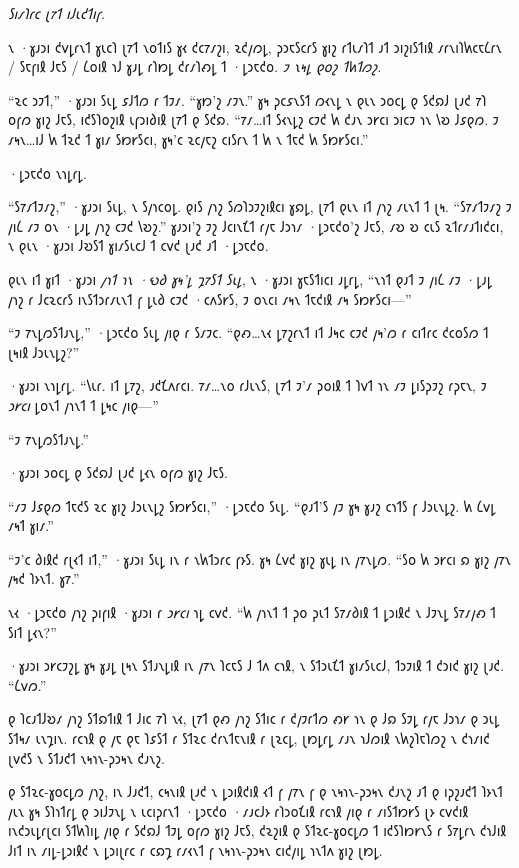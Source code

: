 \emph{𐑕𐑦𐑥𐑐𐑩𐑤 𐑚𐑳𐑑 𐑦𐑓𐑧𐑒𐑑𐑦𐑝.}

𐑯 ·𐑣𐑨𐑮𐑦 𐑒𐑫𐑛𐑩𐑯𐑑 𐑣𐑧𐑤𐑐 𐑚𐑳𐑑 𐑯𐑴𐑑𐑦𐑕 𐑣𐑬 𐑒𐑤𐑳𐑥𐑟𐑦, 𐑷𐑒𐑢𐑼𐑛, 𐑜𐑮𐑱𐑕𐑤𐑩𐑕 𐑣𐑦𐑟 𐑩𐑑𐑧𐑥𐑐𐑑 𐑨𐑑 𐑮𐑦𐑟𐑦𐑕𐑑𐑦𐑙 𐑥𐑩𐑯𐑦𐑐𐑿𐑤𐑱𐑖𐑩𐑯 / 𐑕𐑱𐑝𐑦𐑙 𐑓𐑱𐑕 / 𐑖𐑴𐑦𐑙 𐑪𐑓 𐑣𐑨𐑛 𐑩𐑐𐑽𐑛 𐑒𐑩𐑥𐑐𐑺𐑛 𐑑 ·𐑛𐑮𐑱𐑒𐑴. \emph{𐑲 𐑯𐑰𐑛 𐑞𐑴𐑟 𐑑𐑿𐑑𐑼𐑟.}

“𐑷𐑤 𐑮𐑲𐑑,” ·𐑣𐑨𐑮𐑦 𐑕𐑧𐑛 𐑭𐑓𐑑𐑼 𐑩 𐑑𐑲𐑥. “𐑣𐑽'𐑟 𐑥𐑲𐑯.” 𐑣𐑰 𐑜𐑤𐑭𐑯𐑕𐑑 𐑼𐑬𐑯𐑛 𐑯 𐑞𐑧𐑯 𐑮𐑴𐑤𐑛 𐑞 𐑕𐑒𐑸𐑓 𐑚𐑨𐑒 𐑳𐑐 𐑴𐑝𐑼 𐑣𐑦𐑟 𐑓𐑱𐑕, 𐑦𐑒𐑕𐑐𐑴𐑟𐑦𐑙 𐑧𐑝𐑮𐑦𐑔𐑦𐑙 𐑚𐑳𐑑 𐑞 𐑕𐑒𐑸. “𐑳𐑥…𐑦𐑑 𐑕𐑬𐑯𐑛𐑟 𐑤𐑲𐑒 𐑿 𐑒𐑨𐑯 𐑮𐑾𐑤𐑦 𐑮𐑦𐑤𐑲 𐑪𐑯 𐑘𐑹 𐑓𐑭𐑞𐑼. 𐑲 𐑥𐑰𐑯…𐑦𐑓 𐑿 𐑑𐑷𐑒 𐑑 𐑣𐑦𐑥 𐑕𐑽𐑾𐑕𐑤𐑦, 𐑣𐑰'𐑤 𐑷𐑤𐑢𐑱𐑟 𐑤𐑦𐑕𐑩𐑯 𐑑 𐑿 𐑯 𐑑𐑱𐑒 𐑿 𐑕𐑽𐑾𐑕𐑤𐑦.”

·𐑛𐑮𐑱𐑒𐑴 𐑯𐑪𐑛𐑩𐑛.

“𐑕𐑳𐑥𐑑𐑲𐑥𐑟,” ·𐑣𐑨𐑮𐑦 𐑕𐑧𐑛, 𐑯 𐑕𐑢𐑪𐑤𐑴𐑛. 𐑞𐑦𐑕 𐑢𐑪𐑟 𐑕𐑼𐑐𐑮𐑲𐑟𐑦𐑙𐑤𐑦 𐑣𐑸𐑛, 𐑚𐑳𐑑 𐑞𐑧𐑯 𐑦𐑑 𐑢𐑪𐑟 𐑥𐑧𐑯𐑑 𐑑 𐑚𐑰. “𐑕𐑳𐑥𐑑𐑲𐑥𐑟 𐑲 𐑢𐑦𐑖 𐑥𐑲 𐑴𐑯 ·𐑛𐑨𐑛 𐑢𐑪𐑟 𐑤𐑲𐑒 𐑘𐑹𐑟.” 𐑣𐑨𐑮𐑦'𐑟 𐑲𐑟 𐑓𐑤𐑦𐑯𐑗𐑑 𐑩𐑢𐑱 𐑓𐑮𐑪𐑥 ·𐑛𐑮𐑱𐑒𐑴'𐑟 𐑓𐑱𐑕, 𐑥𐑹 𐑹 𐑤𐑧𐑕 𐑷𐑑𐑩𐑥𐑨𐑑𐑦𐑒𐑤𐑦, 𐑯 𐑞𐑧𐑯 ·𐑣𐑨𐑮𐑦 𐑓𐑹𐑕𐑑 𐑣𐑦𐑥𐑕𐑧𐑤𐑓 𐑑 𐑤𐑫𐑒 𐑚𐑨𐑒 𐑨𐑑 ·𐑛𐑮𐑱𐑒𐑴.

𐑞𐑧𐑯 𐑦𐑑 𐑣𐑦𐑑 ·𐑣𐑨𐑮𐑦 \emph{𐑢𐑪𐑑 𐑪𐑯 ·𐑻𐑔 𐑣𐑰'𐑛 𐑡𐑳𐑕𐑑 𐑕𐑧𐑛}, 𐑯 ·𐑣𐑨𐑮𐑦 𐑣𐑱𐑕𐑑𐑦𐑤𐑦 𐑨𐑛𐑩𐑛, “𐑯𐑪𐑑 𐑞𐑨𐑑 𐑲 𐑢𐑦𐑖 𐑥𐑲 ·𐑛𐑨𐑛 𐑢𐑪𐑟 𐑩 𐑓𐑤𐑷𐑤𐑩𐑕 𐑦𐑯𐑕𐑑𐑮𐑩𐑥𐑧𐑯𐑑 𐑝 𐑛𐑧𐑔 𐑤𐑲𐑒 ·𐑤𐑵𐑕𐑾𐑕, 𐑲 𐑴𐑯𐑤𐑦 𐑥𐑰𐑯 𐑑𐑱𐑒𐑦𐑙 𐑥𐑰 𐑕𐑽𐑾𐑕𐑤𐑦—”

“𐑲 𐑳𐑯𐑛𐑼𐑕𐑑𐑨𐑯𐑛,” ·𐑛𐑮𐑱𐑒𐑴 𐑕𐑧𐑛 𐑢𐑦𐑞 𐑩 𐑕𐑥𐑲𐑤. “𐑞𐑺…𐑯𐑬 𐑛𐑳𐑟𐑩𐑯𐑑 𐑦𐑑 𐑓𐑰𐑤 𐑤𐑲𐑒 𐑢𐑰'𐑼 𐑩 𐑤𐑦𐑑𐑩𐑤 𐑒𐑤𐑴𐑕𐑼 𐑑 𐑚𐑰𐑦𐑙 𐑓𐑮𐑧𐑯𐑛𐑟?”

·𐑣𐑨𐑮𐑦 𐑯𐑪𐑛𐑩𐑛. “𐑘𐑧𐑩. 𐑦𐑑 𐑛𐑳𐑟, 𐑨𐑒𐑗𐑵𐑩𐑤𐑦. 𐑳𐑥…𐑯𐑴 𐑩𐑓𐑧𐑯𐑕, 𐑚𐑳𐑑 𐑲'𐑥 𐑜𐑴𐑦𐑙 𐑑 𐑐𐑫𐑑 𐑪𐑯 𐑥𐑲 𐑛𐑦𐑕𐑜𐑲𐑟 𐑩𐑜𐑱𐑯, 𐑲 \emph{𐑮𐑾𐑤𐑦} 𐑛𐑴𐑯𐑑 𐑢𐑪𐑯𐑑 𐑑 𐑛𐑰𐑤 𐑢𐑦𐑞—”

“𐑲 𐑳𐑯𐑛𐑼𐑕𐑑𐑨𐑯𐑛.”

·𐑣𐑨𐑮𐑦 𐑮𐑴𐑤𐑛 𐑞 𐑕𐑒𐑸𐑓 𐑚𐑨𐑒 𐑛𐑬𐑯 𐑴𐑝𐑼 𐑣𐑦𐑟 𐑓𐑱𐑕.

“𐑥𐑲 𐑓𐑭𐑞𐑼 𐑑𐑱𐑒𐑕 𐑷𐑤 𐑣𐑦𐑟 𐑓𐑮𐑧𐑯𐑛𐑟 𐑕𐑽𐑾𐑕𐑤𐑦,” ·𐑛𐑮𐑱𐑒𐑴 𐑕𐑧𐑛. “𐑞𐑨𐑑'𐑕 𐑢𐑲 𐑣𐑰 𐑣𐑨𐑟 𐑤𐑪𐑑𐑕 𐑝 𐑓𐑮𐑧𐑯𐑛𐑟. 𐑿 𐑖𐑫𐑛 𐑥𐑰𐑑 𐑣𐑦𐑥.”

“𐑲'𐑤 𐑔𐑦𐑙𐑒 𐑩𐑚𐑬𐑑 𐑦𐑑,” ·𐑣𐑨𐑮𐑦 𐑕𐑧𐑛 𐑦𐑯 𐑩 𐑯𐑿𐑑𐑮𐑩𐑤 𐑝𐑶𐑕. 𐑣𐑰 𐑖𐑫𐑒 𐑣𐑦𐑟 𐑣𐑧𐑛 𐑦𐑯 𐑢𐑳𐑯𐑛𐑼. “𐑕𐑴 𐑿 𐑮𐑾𐑤𐑦 𐑸 𐑣𐑦𐑟 𐑢𐑳𐑯 𐑢𐑰𐑒 𐑐𐑶𐑯𐑑. 𐑣𐑳.”

𐑯𐑬 ·𐑛𐑮𐑱𐑒𐑴 𐑢𐑪𐑟 𐑜𐑦𐑝𐑦𐑙 ·𐑣𐑨𐑮𐑦 𐑩 \emph{𐑮𐑾𐑤𐑦} 𐑪𐑛 𐑤𐑫𐑒. “𐑿 𐑢𐑪𐑯𐑑 𐑑 𐑜𐑴 𐑜𐑧𐑑 𐑕𐑳𐑥𐑔𐑦𐑙 𐑑 𐑛𐑮𐑦𐑙𐑒 𐑯 𐑓𐑲𐑯𐑛 𐑕𐑳𐑥𐑢𐑺 𐑑 𐑕𐑦𐑑 𐑛𐑬𐑯?”

·𐑣𐑨𐑮𐑦 𐑮𐑾𐑤𐑲𐑟𐑛 𐑣𐑰 𐑣𐑨𐑛 𐑚𐑰𐑯 𐑕𐑑𐑨𐑯𐑛𐑦𐑙 𐑦𐑯 𐑢𐑳𐑯 𐑐𐑤𐑱𐑕 𐑓 𐑑𐑵 𐑤𐑪𐑙, 𐑯 𐑕𐑑𐑮𐑧𐑗𐑑 𐑣𐑦𐑥𐑕𐑧𐑤𐑓, 𐑑𐑮𐑲𐑦𐑙 𐑑 𐑒𐑮𐑦𐑒 𐑣𐑦𐑟 𐑚𐑨𐑒. “𐑖𐑫𐑼.”

𐑞 𐑐𐑤𐑨𐑑𐑓𐑹𐑥 𐑢𐑪𐑟 𐑕𐑑𐑸𐑑𐑦𐑙 𐑑 𐑓𐑦𐑤 𐑳𐑐 𐑯𐑬, 𐑚𐑳𐑑 𐑞𐑺 𐑢𐑪𐑟 𐑕𐑑𐑦𐑤 𐑩 𐑒𐑢𐑲𐑩𐑑𐑼 𐑺𐑾 𐑪𐑯 𐑞 𐑓𐑸 𐑕𐑲𐑛 𐑩𐑢𐑱 𐑓𐑮𐑪𐑥 𐑞 𐑮𐑧𐑛 𐑕𐑑𐑰𐑥 𐑧𐑯𐑡𐑦𐑯. 𐑩𐑤𐑪𐑙 𐑞 𐑢𐑱 𐑞𐑱 𐑐𐑭𐑕𐑑 𐑩 𐑕𐑑𐑷𐑤 𐑒𐑩𐑯𐑑𐑱𐑯𐑦𐑙 𐑩 𐑚𐑷𐑤𐑛, 𐑚𐑽𐑛𐑩𐑛 𐑥𐑨𐑯 𐑪𐑓𐑼𐑦𐑙 𐑯𐑿𐑟𐑐𐑱𐑐𐑼𐑟 𐑯 𐑒𐑪𐑥𐑦𐑒 𐑚𐑫𐑒𐑕 𐑯 𐑕𐑑𐑨𐑒𐑑 𐑯𐑰𐑪𐑯-𐑜𐑮𐑰𐑯 𐑒𐑨𐑯𐑟.

𐑞 𐑕𐑑𐑷𐑤-𐑣𐑴𐑤𐑛𐑼 𐑢𐑪𐑟, 𐑦𐑯 𐑓𐑨𐑒𐑑, 𐑤𐑰𐑯𐑦𐑙 𐑚𐑨𐑒 𐑯 𐑛𐑮𐑦𐑙𐑒𐑦𐑙 𐑬𐑑 𐑝 𐑢𐑳𐑯 𐑝 𐑞 𐑯𐑰𐑪𐑯-𐑜𐑮𐑰𐑯 𐑒𐑨𐑯𐑟 𐑨𐑑 𐑞 𐑦𐑜𐑟𐑨𐑒𐑑 𐑐𐑶𐑯𐑑 𐑢𐑧𐑯 𐑣𐑰 𐑕𐑐𐑪𐑑𐑩𐑛 𐑞 𐑮𐑦𐑓𐑲𐑯𐑛 𐑯 𐑧𐑤𐑦𐑜𐑩𐑯𐑑 ·𐑛𐑮𐑱𐑒𐑴 ·𐑥𐑨𐑤𐑓𐑶 𐑩𐑐𐑮𐑴𐑗𐑦𐑙 𐑩𐑤𐑪𐑙 𐑢𐑦𐑞 𐑩 𐑥𐑦𐑕𐑑𐑽𐑾𐑕 𐑚𐑶 𐑤𐑫𐑒𐑦𐑙 𐑦𐑯𐑒𐑮𐑧𐑛𐑩𐑚𐑤𐑦 𐑕𐑑𐑿𐑐𐑦𐑛 𐑢𐑦𐑞 𐑩 𐑕𐑒𐑸𐑓 𐑑𐑲𐑛 𐑴𐑝𐑼 𐑣𐑦𐑟 𐑓𐑱𐑕, 𐑒𐑷𐑟𐑦𐑙 𐑞 𐑕𐑑𐑷𐑤-𐑣𐑴𐑤𐑛𐑼 𐑑 𐑦𐑒𐑕𐑐𐑽𐑾𐑯𐑕 𐑩 𐑕𐑳𐑛𐑩𐑯 𐑒𐑪𐑓𐑦𐑙 𐑓𐑦𐑑 𐑦𐑯 𐑥𐑦𐑛-𐑛𐑮𐑦𐑙𐑒 𐑯 𐑛𐑮𐑦𐑚𐑩𐑤 𐑩 𐑤𐑸𐑡 𐑩𐑥𐑬𐑯𐑑 𐑝 𐑯𐑰𐑪𐑯-𐑜𐑮𐑰𐑯 𐑤𐑦𐑒𐑢𐑦𐑛 𐑪𐑯𐑑𐑵 𐑣𐑦𐑟 𐑚𐑽𐑛.

